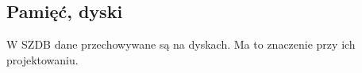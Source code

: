 \documentclass[12pt]{article}
\begin{document}
\subsection{Pamięć, dyski}
W SZDB dane przechowywane są na dyskach. Ma to znaczenie przy ich projektowaniu.
\begin{comment}
 * READ -- transfer z dysku do RAM
 * WRITE -- zapis z RAM na dysk
 * te operacje są kosztowne w porównaniu do operacji w pamięci

Server: pamięć, procesy komunikujące i dysk

Komponenty tworzące SZDB:
 * dysk
  * struktury przechowujące dane
  * struktury przechowujące opis danych
  * struktury zapewniające przetwarzanie transakcyjne
  * struktury zapewniające bezpieczeństwo
 * procesy
  * operacje związane z funkcjonowaniem serwera
  * operacje wykonywane ``na zlecenie`` aplikacji klienckich
 * pamięć
  * pula buforów
  * struktury kontrolne

Typowy system ma dużo więcej danych na dysku niż może przechowywać w pamięci.

 * RAID
 * backup danych, backup logów (raz na jakiś czas zapisujemy dane, ciągle backupujemy logi)
  * w przypadku awarii restore danych a potem wykonujemy logi od ostatniego dobrego backupu

 * replikacja
  * zabezpieczenie przed utratą wszystkiego (serwer wykonuje log i przesyła go gdzieś indziej, do innego serwera)
  * przybliżenie użytkownikowi danych (coraz mniejsza rola tej funkcji, przepustowość sieci rośnie)

Struktury dyskowe
 * czas dostępu do dysku jest bardzo wolny
 * operujemy na dużych zbiorach danych
 * powinny zapewniać wydajność i bezpieczeństwo

Storage-device hierarchy:
  cache (najszybszy) <=> main memory <=> flash memory <=> magnetic disk <=> optical disk <=> magnetic tapes (najwolniejszy)

Dysk:
 * głowica
 * talerz
 * ścieżka
 * cylinder
 * blok
 * sektor

time = seek time (head)(longest?) + rotation delay + transfer time

Dostęp:
 * random (1o-krotni wolniejsze)
 * następny blok
 * sekwencyjny

Przykład:
transfer rate = 4ooo KB
avg seek time = o.o1 s
page          = 2KB

* random (1 strona): (2 KB / (o.o1 s + (2 KB / ( 4ooo KB/s )))) = 19o KB/s
* sekwencyjny (3o stron): (60 KB / (o.o1 s + (60 KB / ( 4ooo KB/s )))) = 24oo KB/s


\end{comment}
\end{document}
